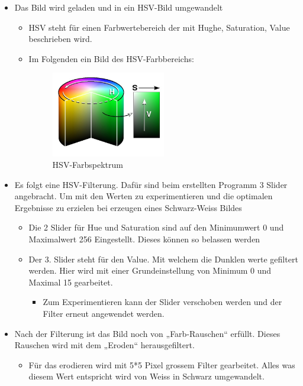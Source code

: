 \begin{itemize}
	\item Das Bild wird geladen und in ein HSV-Bild umgewandelt
	\begin{itemize}
		\item HSV steht für einen Farbwertebereich der mit Hughe, Saturation, Value beschrieben wird.
		\item Im Folgenden ein Bild des HSV-Farbbereichs:\\
		\begin{figure}[h!]
			\centering
			\includegraphics[width=0.5\textwidth]{fig/HSV_cylinder.jpg}
			\caption{HSV-Farbspektrum}
			\label{fig:HSV-Farbspektrum}
		\end{figure}
	\end{itemize}
	\item Es folgt eine HSV-Filterung. Dafür sind beim erstellten Programm 3 Slider angebracht. Um mit den Werten zu experimentieren und die optimalen Ergebnisse zu erzielen bei erzeugen eines Schwarz-Weiss Bildes
	\begin{itemize}
		\item Die 2 Slider für Hue und Saturation sind auf den Minimumwert 0 und Maximalwert 256 Eingestellt. Dieses können so belassen werden
		\item Der 3. Slider steht für den Value. Mit welchem die Dunklen werte gefiltert werden. Hier wird mit einer Grundeinstellung von Minimum 0 und Maximal 15 gearbeitet.
		\begin{itemize}
			\item Zum Experimentieren kann der Slider verschoben werden und der Filter erneut angewendet werden.
		\end{itemize}
	\end{itemize}
	\item Nach der Filterung ist das Bild noch von „Farb-Rauschen“ erfüllt. Dieses Rauschen wird mit dem „Eroden“ herausgefiltert.
	\begin{itemize}
		\item Für das erodieren wird mit 5*5 Pixel grossem Filter gearbeitet. Alles was diesem Wert entspricht wird von Weiss in Schwarz umgewandelt.

\end{itemize}
\end{itemize}
